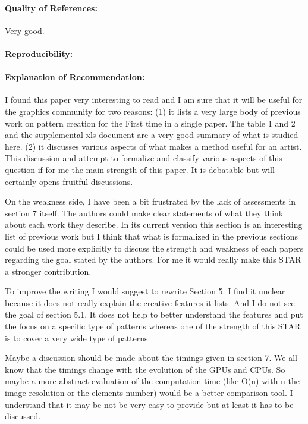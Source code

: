 \documentclass{egpubl}
\begin{document}
\paragraph*{Quality of References:} Very good.
\paragraph*{Reproducibility:} 
\paragraph*{Explanation of Recommendation:} I found this paper very interesting to read and I am sure that it will be useful for the graphics community for two reasons: 
(1) it lists a very large body of previous work on pattern creation for the First time in a single paper. The table 1 and 2 and the supplemental xls document are a very good summary of what is studied here.
(2) it discusses various aspects of what makes a method useful for an artist. This discussion and attempt to formalize and classify various aspects of this question if for me the main strength of this paper. It is debatable but will certainly opens fruitful discussions.

On the weakness side, I have been a bit frustrated by the lack of assessments in section 7 itself. The authors could make clear statements of what they think about each work they describe. In its current version this section is an interesting list of previous work but I think that what is formalized in the previous sections could be used more explicitly to discuss the strength and weakness of each papers regarding the goal stated by the authors. 
For me it would really make this STAR a stronger contribution.

To improve the writing I would suggest to rewrite Section 5. I find it unclear because it does not really explain the creative features it lists. And I do not see the goal of section 5.1. It does not help to better understand the features and put the focus on a specific type of patterns whereas one of the strength of this STAR is to cover a very wide type of patterns. 

Maybe a discussion should be made about the timings given in section 7. We all know that the timings change with the evolution of the GPUs and CPUs. So maybe a more abstract evaluation of the computation time (like O(n) with n the image resolution or the elements number) would be a better comparison tool. I understand that it may be not be very easy to provide but at least it has to be discussed.
\end{document}
